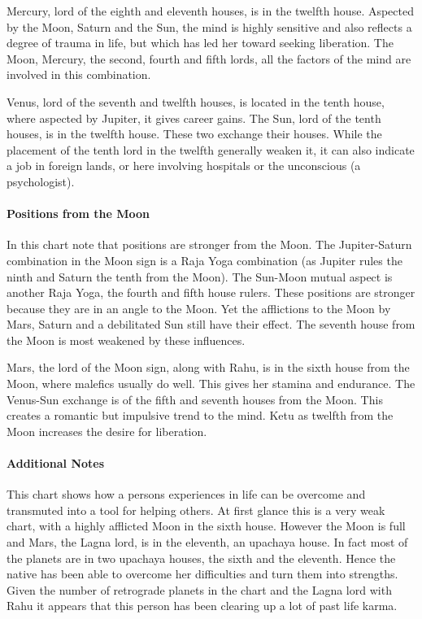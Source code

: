 

Mercury, lord of the eighth and eleventh houses, is in the twelfth house. Aspected by the Moon, Saturn and the Sun, the mind is highly sensitive and also reflects a degree of trauma in life, but which has led her toward seeking liberation. The Moon, Mercury, the second, fourth and fifth lords, all the factors of the mind are involved in this combination.

 

Venus, lord of the seventh and twelfth houses, is located in the tenth house, where aspected by Jupiter, it gives career gains. The Sun, lord of the tenth houses, is in the twelfth house. These two exchange their houses. While the placement of the tenth lord in the twelfth generally weaken it, it can also indicate a job in foreign lands, or here involving hospitals or the unconscious (a psychologist).

 

\paragraph{Positions from the Moon}

 

In this chart note that positions are stronger from the Moon. The Jupiter-Saturn combination in the Moon sign is a Raja Yoga combination (as Jupiter rules the ninth and Saturn the tenth from the Moon). The Sun-Moon mutual aspect is another Raja Yoga, the fourth and fifth house rulers. These positions are stronger because they are in an angle to the Moon. Yet the afflictions to the Moon by Mars, Saturn and a debilitated Sun still have their effect. The seventh house from the Moon is most weakened by these influences.

 

Mars, the lord of the Moon sign, along with Rahu, is in the sixth house from the Moon, where malefics usually do well. This gives her stamina and endurance. The Venus-Sun exchange is of the fifth and seventh houses from the Moon. This creates a romantic but impulsive trend to the mind. Ketu as twelfth from the Moon increases the desire for liberation.

 

\paragraph{Additional Notes}

 

This chart shows how a persons experiences in life can be overcome and transmuted into a tool for helping others. At first glance this is a very weak chart, with a highly afflicted Moon in the sixth house. However the Moon is full and Mars, the Lagna lord, is in the eleventh, an upachaya house. In fact most of the planets are in two upachaya houses, the sixth and the eleventh. Hence the native has been able to overcome her difficulties and turn them into strengths. Given the number of retrograde planets in the chart and the Lagna lord with Rahu it appears that this person has been clearing up a lot of past life karma.

